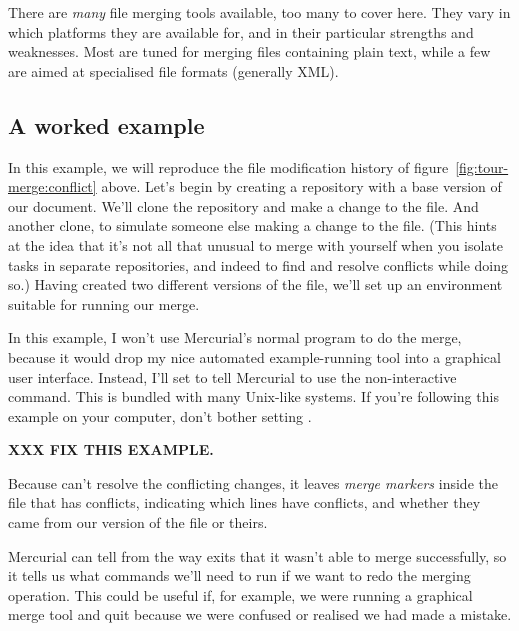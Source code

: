 There are \emph{many} file merging tools available, too many to cover
here.  They vary in which platforms they are available for, and in
their particular strengths and weaknesses.  Most are tuned for merging
files containing plain text, while a few are aimed at specialised file
formats (generally XML).

\subsection{A worked example}

In this example, we will reproduce the file modification history of
figure~\ref{fig:tour-merge:conflict} above.  Let's begin by creating a
repository with a base version of our document.
We'll clone the repository and make a change to the file.
And another clone, to simulate someone else making a change to the
file.  (This hints at the idea that it's not all that unusual to merge
with yourself when you isolate tasks in separate repositories, and
indeed to find and resolve conflicts while doing so.)
Having created two different versions of the file, we'll set up an
environment suitable for running our merge.

In this example, I won't use Mercurial's normal 
program to do the merge, because it would drop my nice automated
example-running tool into a graphical user interface.  Instead, I'll
set  to tell Mercurial to use the non-interactive
 command.  This is bundled with many Unix-like systems.
If you're following this example on your computer, don't bother
setting .

\textbf{XXX FIX THIS EXAMPLE.}

Because  can't resolve the conflicting changes, it
leaves \emph{merge markers} inside the file that has conflicts,
indicating which lines have conflicts, and whether they came from our
version of the file or theirs.

Mercurial can tell from the way  exits that it wasn't
able to merge successfully, so it tells us what commands we'll need to
run if we want to redo the merging operation.  This could be useful
if, for example, we were running a graphical merge tool and quit
because we were confused or realised we had made a mistake.

